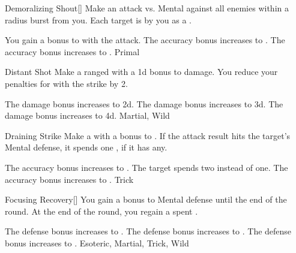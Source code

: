 \lowercase{\hypertarget{maneuver:Demoralizing Shout}{}}\label{maneuver:Demoralizing Shout}
\hypertarget{maneuver:Demoralizing Shout}{}
\begin{apability}{Demoralizing Shout}[]
Make an attack vs. Mental against all enemies within a \arealarge radius burst from you.
\hit Each target is  by you as a .

\rankline
{} You gain a  bonus to  with the attack.
 The accuracy bonus increases to .
 The accuracy bonus increases to .
 Primal
\end{apability}
\vspace{0.25em}



\lowercase{\hypertarget{maneuver:Distant Shot}{}}\label{maneuver:Distant Shot}
\hypertarget{maneuver:Distant Shot}{}
\begin{apability}{Distant Shot}
Make a ranged  with a \plus1d bonus to damage.
You reduce your penalties for  with the strike by 2.

\rankline
{} The damage bonus increases to \plus2d.
 The damage bonus increases to \plus3d.
 The damage bonus increases to \plus4d.
 Martial, Wild
\end{apability}
\vspace{0.25em}



\lowercase{\hypertarget{maneuver:Draining Strike}{}}\label{maneuver:Draining Strike}
\hypertarget{maneuver:Draining Strike}{}
\begin{apability}{Draining Strike}
Make a  with a  bonus to .
If the attack result hits the target's Mental defense,
it spends one , if it has any.

\rankline
{} The accuracy bonus increases to .
 The target spends two  instead of one.
 The accuracy bonus increases to .
 Trick
\end{apability}
\vspace{0.25em}



\lowercase{\hypertarget{maneuver:Focusing Recovery}{}}\label{maneuver:Focusing Recovery}
\hypertarget{maneuver:Focusing Recovery}{}
\begin{freeability}{Focusing Recovery}[]
You gain a  bonus to Mental defense until the end of the round.
At the end of the round, you regain a spent .

\rankline
{} The defense bonus increases to .
 The defense bonus increases to .
 The defense bonus increases to .
 Esoteric, Martial, Trick, Wild
\end{freeability}
\vspace{0.25em}



